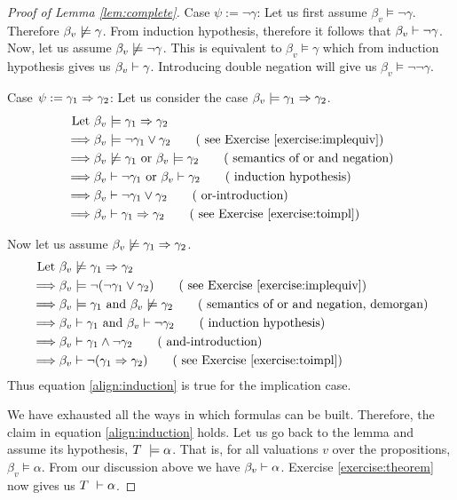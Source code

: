 \begin{proof} [Proof of Lemma \ref{lem:complete}]
Case $\psi := \neg \gamma$: Let us first assume $\beta_v \models \neg \gamma$. Therefore $\beta_v \not \models \gamma$. From induction hypothesis, therefore it follows that $\beta_v \vdash \neg \gamma$. Now, let us assume $\beta_v \not \models \neg \gamma$. This is equivalent to $\beta_v \models \gamma$ which from induction hypothesis gives us $\beta_v \vdash \gamma$. Introducing double negation will give us $\beta_v \models \neg \neg \gamma$.

Case $\psi := \gamma_1 \Rightarrow \gamma_2$: Let us consider the case $\beta_v \models \gamma_1 \Rightarrow \gamma_2$.
\begin{align*}
\text{Let } & \beta_v \models \gamma_1 \ifthen \gamma_2
\\ \implies & \beta_v \models \neg \gamma_1 \vee \gamma_2 \tag{ see Exercise \ref{exercise:implequiv}}
\\ \implies & \beta_v \nmodels \gamma_1 \text{ or } \beta_v \models \gamma_2  \tag{ semantics of or and negation}
\\ \implies & \beta_v \proves \neg \gamma_1 \text { or } \beta_v \proves \gamma_2  \tag{ induction hypothesis}
\\ \implies & \beta_v \proves \neg \gamma_1 \vee \gamma_2  \tag{ or-introduction}	
\\ \implies & \beta_v \proves \gamma_1 \ifthen \gamma_2 \tag{ see Exercise \ref{exercise:toimpl}}
\end{align*}

Now let us assume $\beta_v \not \models \gamma_1 \Rightarrow \gamma_2$. 
\begin{align*}
\text{Let } & \beta_v \nmodels \gamma_1 \ifthen \gamma_2
\\ \implies & \beta_v \models \neg (\neg \gamma_1 \vee \gamma_2) \tag{ see Exercise \ref{exercise:implequiv}}
\\ \implies & \beta_v \models \gamma_1 \text{ and } \beta_v \nmodels \gamma_2  \tag{ semantics of or and negation, demorgan}
\\ \implies & \beta_v \proves  \gamma_1 \text { and } \beta_v \proves \neg \gamma_2  \tag{ induction hypothesis}
\\ \implies & \beta_v \proves  \gamma_1 \wedge \neg \gamma_2  \tag{ and-introduction}	
\\ \implies & \beta_v \proves \neg (\gamma_1 \ifthen \gamma_2) \tag{ see Exercise \ref{exercise:toimpl}}
\end{align*}
Thus equation \ref{align:induction} is true for the implication case.

We have exhausted all the ways in which formulas can be built. Therefore, the claim in equation \ref{align:induction} holds. Let us go back to the lemma and assume its hypothesis,  $T ~\models \alpha$. That is, for all valuations $v$ over the propositions, $\beta_v \models \alpha$. From our discussion above we have $\beta_v \vdash \alpha$. Exercise \ref{exercise:theorem} now gives us $T ~\vdash \alpha$.
\end{proof}


